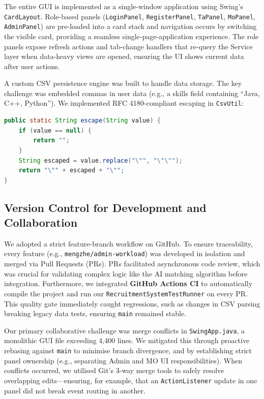 \documentclass[12pt, a4paper]{article}
\begin{document}
The entire GUI is implemented as a single-window application using Swing's \texttt{CardLayout}. Role-based panels (\texttt{LoginPanel}, \texttt{RegisterPanel}, \texttt{TaPanel}, \texttt{MoPanel}, \texttt{AdminPanel}) are pre-loaded into a card stack and navigation occurs by switching the visible card, providing a seamless single-page-application experience. The role panels expose refresh actions and tab-change handlers that re-query the Service layer when data-heavy views are opened, ensuring the UI shows current data after user actions.

A custom CSV persistence engine was built to handle data storage. The key challenge was embedded commas in user data (e.g., a skills field containing ``Java, C++, Python''). We implemented RFC 4180-compliant escaping in \texttt{CsvUtil}:

\begin{lstlisting}[language=Java, caption=RFC 4180 CSV escaping in CsvUtil.java]
public static String escape(String value) {
    if (value == null) {
        return "";
    }
    String escaped = value.replace("\"", "\"\"");
    return "\"" + escaped + "\"";
}
\end{lstlisting}

\subsection{Version Control for Development and Collaboration}
We adopted a strict feature-branch workflow on GitHub. To ensure traceability, every feature (e.g., \texttt{mengzhe/admin-workload}) was developed in isolation and merged via Pull Requests (PRs). PRs facilitated asynchronous code review, which was crucial for validating complex logic like the AI matching algorithm before integration. Furthermore, we integrated \textbf{GitHub Actions CI} to automatically compile the project and run our \texttt{RecruitmentSystemTestRunner} on every PR. This quality gate immediately caught regressions, such as changes in CSV parsing breaking legacy data tests, ensuring \texttt{main} remained stable.

Our primary collaborative challenge was merge conflicts in \texttt{SwingApp.java}, a monolithic GUI file exceeding 4,400 lines. We mitigated this through proactive rebasing against \texttt{main} to minimise branch divergence, and by establishing strict panel ownership (e.g., separating Admin and MO UI responsibilities). When conflicts occurred, we utilised Git's 3-way merge tools to safely resolve overlapping edits---ensuring, for example, that an \texttt{ActionListener} update in one panel did not break event routing in another.
\end{document}
